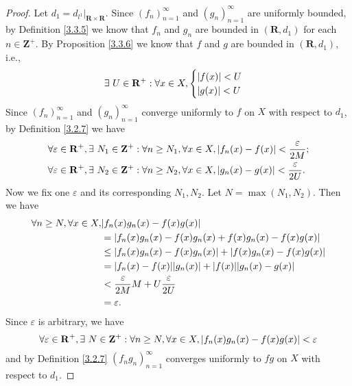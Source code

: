 \begin{proof}
    Let \(d_1 = d_{l^1}|_{\mathbf{R} \times \mathbf{R}}\).
    Since \((f_n)_{n = 1}^\infty\) and \((g_n)_{n = 1}^\infty\) are uniformly bounded, by Definition \ref{3.3.5} we know that \(f_n\) and \(g_n\) are bounded in \((\mathbf{R}, d_1)\) for each \(n \in \mathbf{Z}^+\).
    By Proposition \ref{3.3.6} we know that \(f\) and \(g\) are bounded in \((\mathbf{R}, d_1)\), i.e.,
    \[
        \exists\ U \in \mathbf{R}^+ : \forall x \in X, \begin{cases}
            \abs*{f(x)} < U \\
            \abs*{g(x)} < U
        \end{cases}
    \]
    Since \((f_n)_{n = 1}^\infty\) and \((g_n)_{n = 1}^\infty\) converge uniformly to \(f\) on \(X\) with respect to \(d_1\), by Definition \ref{3.2.7} we have
    \begin{align*}
         & \forall \varepsilon \in \mathbf{R}^+, \exists\ N_1 \in \mathbf{Z}^+ : \forall n \geq N_1, \forall x \in X, \abs*{f_n(x) - f(x)} < \frac{\varepsilon}{2M}; \\
         & \forall \varepsilon \in \mathbf{R}^+, \exists\ N_2 \in \mathbf{Z}^+ : \forall n \geq N_2, \forall x \in X, \abs*{g_n(x) - g(x)} < \frac{\varepsilon}{2U}.
    \end{align*}
    Now we fix one \(\varepsilon\) and its corresponding \(N_1, N_2\).
    Let \(N = \max(N_1, N_2)\).
    Then we have
    \begin{align*}
        \forall n \geq N, \forall x \in X, & \abs*{f_n(x) g_n(x) - f(x) g(x)}                                         \\
                                           & = \abs*{f_n(x) g_n(x) - f(x) g_n(x) + f(x) g_n(x) - f(x) g(x)}           \\
                                           & \leq \abs*{f_n(x) g_n(x) - f(x) g_n(x)} + \abs*{f(x) g_n(x) - f(x) g(x)} \\
                                           & = \abs*{f_n(x) - f(x)} \abs*{g_n(x)} + \abs*{f(x)} \abs*{g_n(x) - g(x)}  \\
                                           & < \frac{\varepsilon}{2M} M + U \frac{\varepsilon}{2U}                    \\
                                           & = \varepsilon.
    \end{align*}
    Since \(\varepsilon\) is arbitrary, we have
    \[
        \forall \varepsilon \in \mathbf{R}^+, \exists\ N \in \mathbf{Z}^+ : \forall n \geq N, \forall x \in X, \abs*{f_n(x) g_n(x) - f(x) g(x)} < \varepsilon
    \]
    and by Definition \ref{3.2.7} \((f_n g_n)_{n = 1}^\infty\) converges uniformly to \(fg\) on \(X\) with respect to \(d_1\).
\end{proof}